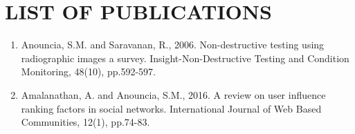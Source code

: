 \chapter*{\centering \large\textbf{LIST OF PUBLICATIONS}}
\noindent
\begin{enumerate}
	\item Anouncia, S.M. and Saravanan, R., 2006. Non-destructive testing using radiographic images a survey. Insight-Non-Destructive Testing and Condition Monitoring, 48(10), pp.592-597.
	
	\item Amalanathan, A. and Anouncia, S.M., 2016. A review on user influence ranking factors in social networks. International Journal of Web Based Communities, 12(1), pp.74-83.	
\end{enumerate}